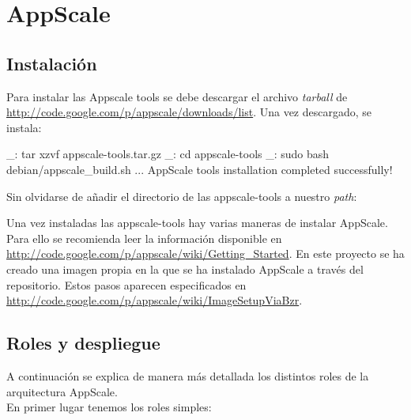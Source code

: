 \chapter{AppScale}
\label{anx:appscale}

\section{Instalación}

Para instalar las Appscale tools se debe descargar el archivo \emph{tarball} de  \url{http://code.google.com/p/appscale/downloads/list}. Una vez descargado, se instala:

\begin{bashcode}
_: tar xzvf appscale-tools.tar.gz
_: cd appscale-tools
_: sudo bash debian/appscale_build.sh
...
AppScale tools installation completed successfully!
\end{bashcode}

Sin olvidarse de añadir el directorio de las appscale-tools a nuestro \emph{path}:


Una vez instaladas las appscale-tools hay varias maneras de instalar AppScale. Para ello se recomienda leer la información disponible en \url{http://code.google.com/p/appscale/wiki/Getting_Started}. En este proyecto se ha creado una imagen propia en la que se ha instalado AppScale a través del repositorio. Estos pasos aparecen especificados en \url{http://code.google.com/p/appscale/wiki/ImageSetupViaBzr}.


\section{Roles y despliegue}
\label{anx:appscale-roles}

A continuación se explica de manera más detallada los distintos roles de la arquitectura AppScale. \\

En primer lugar tenemos los roles simples:

